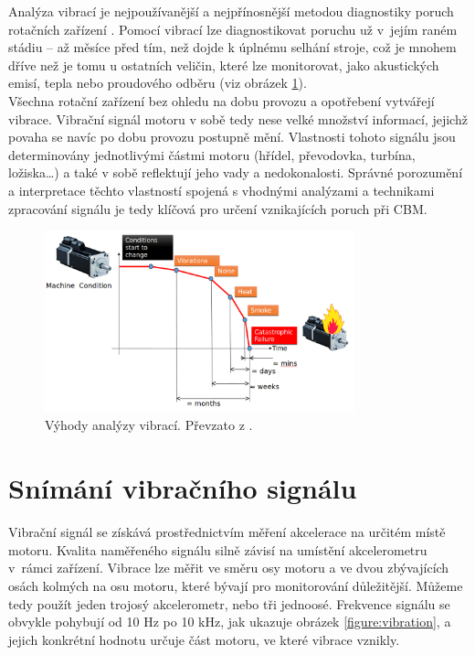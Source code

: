     
    
    Analýza vibrací je nejpoužívanější a nejpřínosnější metodou diagnostiky poruch rotačních zařízení \cite{book:1}. Pomocí vibrací lze diagnostikovat poruchu už v~jejím raném stádiu – až měsíce před tím, než dojde k úplnému selhání stroje, což je mnohem dříve než je tomu u ostatních veličin, které lze monitorovat, jako akustických emisí, tepla nebo proudového odběru (viz obrázek \ref{figure:condition}).\\
    Všechna rotační zařízení bez ohledu na dobu provozu a opotřebení vytvářejí vibrace. 
    Vibrační signál motoru v sobě tedy nese velké množství informací, jejichž povaha se navíc po dobu provozu postupně mění. Vlastnosti tohoto signálu jsou determinovány jednotlivými částmi motoru (hřídel, převodovka, turbína, ložiska\ldots) a také v sobě reflektují jeho vady a nedokonalosti.
    Správné porozumění a interpretace těchto vlastností spojená s vhodnými analýzami a technikami zpracování signálu je tedy klíčová pro určení vznikajících poruch při CBM.
    
    \begin{figure} [!h]
        \centering
        \caption{Výhody analýzy vibrací. Převzato z \cite{prez:2}.}
        \label{figure:condition}
        \includegraphics[width=0.8\textwidth]{DSP/Figs/condition.png}
    \end{figure} 

\section{Snímání vibračního signálu}
\label{section:measuring}
    Vibrační signál se získává prostřednictvím měření akcelerace na určitém místě motoru. Kvalita naměřeného signálu silně závisí na umístění akcelerometru v~rámci zařízení. Vibrace lze měřit ve směru osy motoru a ve dvou zbývajících osách kolmých na osu motoru, které bývají pro monitorování důležitější. Můžeme tedy použít jeden trojosý akcelerometr, nebo tři jednoosé. Frekvence signálu se obvykle pohybují od 10 Hz po 10 kHz, jak ukazuje obrázek \ref{figure:vibration}, a jejich konkrétní hodnotu určuje část motoru, ve které vibrace vznikly.
    
